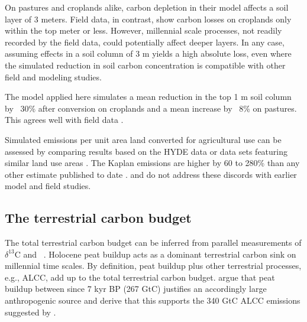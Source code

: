 On pastures and croplands alike, carbon depletion in their model affects a soil layer of 3 meters. Field data, in contrast, show carbon losses on croplands only within the top meter or less. However, millennial scale processes, not readily recorded by the field data, could potentially affect deeper layers. In any case, assuming effects in a soil column of 3 m yields a high absolute loss, even where the simulated reduction in soil carbon concentration is compatible with other field and modeling studies.

The model applied here simulates a mean reduction in the top 1 m soil column by ~30\% after conversion on croplands and a mean increase by ~8\% on pastures. This agrees well with field data \citep{guogifford02gcb, murty02gcb}.

Simulated emissions per unit area land converted for agricultural use can be assessed by comparing results based on the HYDE data or data sets featuring similar land use areas \citep{pongratz08gbc}. The Kaplan emissions are higher by 60 to 280\% than any other estimate published to date \citet{defries99gbc, olofssonhickler2008, pongratz09, strassmann08tel, stocker11bg}. \citet{ruddiman11hol} and \citet{kaplan11} do not address these discords with earlier model and field studies.

\subsection*{The terrestrial carbon budget}
The total terrestrial carbon budget can be inferred from parallel measurements of $\delta^{13}$C and \coo\ \citep{elsig}. Holocene peat buildup acts as a dominant terrestrial carbon sink on millennial time scales. By definition, peat buildup plus other terrestrial processes, e.g., ALCC, add up to the total terrestrial carbon budget.\citet{ruddiman11hol} argue that peat buildup between since 7 kyr BP (267 GtC) justifies an accordingly large anthropogenic source and derive that this supports the 340 GtC ALCC emissions suggested by \citet{kaplan09}.

